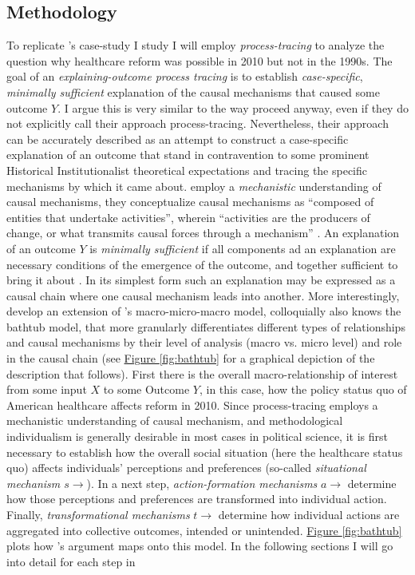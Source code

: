 \documentclass[11pt]{article}
\begin{document}
\subsection*{Methodology}

To replicate \citeauthor{Jacobs2014}'s \parencite*{Jacobs2014} case-study I study I will employ \textit{process-tracing} to analyze the question why healthcare reform was possible in 2010 but not in the 1990s. The goal of an \textit{explaining-outcome process tracing} \parencite[][]{Beach2019} is to establish \textit{case-specific}, \textit{minimally sufficient} explanation of the causal mechanisms that caused some outcome $Y$. I argue this is very similar to the way \textcite[][]{Jacobs2014} proceed anyway, even if they do not explicitly call their approach process-tracing. Nevertheless, their approach can be accurately described as an attempt to construct a case-specific explanation of an outcome that stand in contravention to some prominent Historical Institutionalist theoretical expectations and tracing the specific mechanisms by which it came about. \textcite[][]{Beach2019} employ a \textit{mechanistic} understanding of causal mechanisms, they conceptualize causal mechanisms as  \enquote{composed of entities that undertake activities}, wherein \enquote{activities are the producers of change, or what transmits causal forces through a mechanism} . An explanation of an outcome $Y$ is \textit{minimally sufficient} if all components ad an explanation are necessary conditions of the emergence of the outcome, and together sufficient to bring it about \parencite[see e.g.][]{Goertz2007}. In its simplest form such an explanation may be expressed as a causal chain where one causal mechanism leads into another. More interestingly, \textcite[][]{Hedström1998} develop an extension of \citeauthor[][]{Coleman1986}'s \parencite*{Coleman1986} macro-micro-macro model, colloquially also knows the bathtub model, that more granularly differentiates different types of relationships and causal mechanisms by their level of analysis (macro vs. micro level) and role in the causal chain (see \hyperref[fig:bathtub]{Figure \ref*{fig:bathtub}} for a graphical depiction of the description that follows). First there is the overall macro-relationship of interest from some input $X$ to some Outcome $Y$, in this case, how the policy status quo of American healthcare affects reform in 2010. Since process-tracing employs a mechanistic understanding of causal mechanism, and methodological individualism is generally desirable in most cases in political science, it is first necessary to establish how the overall social situation (here the healthcare status quo) affects individuals' perceptions and preferences (so-called \textit{situational mechanism $s\to$}). In a next step, \textit{action-formation mechanisms} $a\to$ determine how those perceptions and preferences are transformed into individual action. Finally, \textit{transformational mechanisms} $t\to$ determine how individual actions are aggregated into collective outcomes, intended or unintended. \hyperref[fig:bathtub]{Figure \ref*{fig:bathtub}} plots how \citeauthor{Jacobs2014}'s \parencite*{Jacobs2014} argument maps onto this model. In the following sections I will go into detail for each step in 
\end{document}
